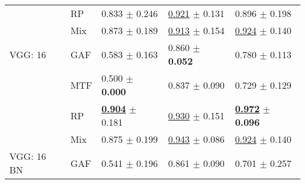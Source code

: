 \begin{tabular}[t]{lllll}
 & RP & \textcolor[rgb]{0.1665182547,0.5000000000,0}{0.833} $\pm$ \textcolor[rgb]{0.9410679338,0.0589320662,0}{0.246} & \underline{\textcolor[rgb]{0.1991869919,0.5000000000,0}{0.921}} $\pm$ \textcolor[rgb]{0.4957921792,0.5000000000,0}{0.131} & \textcolor[rgb]{0.2820512821,0.5000000000,0}{0.896} $\pm$ \textcolor[rgb]{0.6330964479,0.3669035521,0}{0.198} \\
 & Mix & \textcolor[rgb]{0.0739091719,0.5000000000,0}{0.873} $\pm$ \textcolor[rgb]{0.7220818610,0.2779181390,0}{0.189} & \underline{\textcolor[rgb]{0.2378048780,0.5000000000,0}{0.913}} $\pm$ \textcolor[rgb]{0.6415115340,0.3584884660,0}{0.154} & \underline{\textcolor[rgb]{0.1794871795,0.5000000000,0}{0.924}} $\pm$ \textcolor[rgb]{0.2698456329,0.5000000000,0}{0.140} \\
VGG: 16 & GAF & \textcolor[rgb]{0.7542297418,0.2457702582,0}{0.583} $\pm$ \textcolor[rgb]{0.6224579299,0.3775420701,0}{0.163} & \textcolor[rgb]{0.5110864745,0.4889135255,0}{0.860} $\pm$ \textbf{\textcolor[rgb]{0.0000000000,0.5000000000,0}{0.052}} & \textcolor[rgb]{0.7086247086,0.2913752914,0}{0.780} $\pm$ \textcolor[rgb]{0.1071119150,0.5000000000,0}{0.113} \\
 & MTF & \textcolor[rgb]{0.9501335708,0.0498664292,0}{0.500} $\pm$ \textbf{\textcolor[rgb]{0.0000000000,0.5000000000,0}{0.000}} & \textcolor[rgb]{0.6260162602,0.3739837398,0}{0.837} $\pm$ \textcolor[rgb]{0.2377009274,0.5000000000,0}{0.090} & \textcolor[rgb]{0.8974358974,0.1025641026,0}{0.729} $\pm$ \textcolor[rgb]{0.2017357855,0.5000000000,0}{0.129} \\
 & RP & \underline{\textbf{\textcolor[rgb]{0.0000000000,0.5000000000,0}{0.904}}} $\pm$ \textcolor[rgb]{0.6937384685,0.3062615315,0}{0.181} & \underline{\textcolor[rgb]{0.1524390244,0.5000000000,0}{0.930}} $\pm$ \textcolor[rgb]{0.6254081161,0.3745918839,0}{0.151} & \underline{\textbf{\textcolor[rgb]{0.0000000000,0.5000000000,0}{0.972}}} $\pm$ \textbf{\textcolor[rgb]{0.0000000000,0.5000000000,0}{0.096}} \\
 & Mix & \textcolor[rgb]{0.0685663402,0.5000000000,0}{0.875} $\pm$ \textcolor[rgb]{0.7623521573,0.2376478427,0}{0.199} & \underline{\textcolor[rgb]{0.0853658537,0.5000000000,0}{0.943}} $\pm$ \textcolor[rgb]{0.2161475738,0.5000000000,0}{0.086} & \underline{\textcolor[rgb]{0.1794871795,0.5000000000,0}{0.924}} $\pm$ \textcolor[rgb]{0.2698456329,0.5000000000,0}{0.140} \\
VGG: 16 BN & GAF & \textcolor[rgb]{0.8539626002,0.1460373998,0}{0.541} $\pm$ \textcolor[rgb]{0.7491692816,0.2508307184,0}{0.196} & \textcolor[rgb]{0.5066518847,0.4933481153,0}{0.861} $\pm$ \textcolor[rgb]{0.2377250888,0.5000000000,0}{0.090} & \textcolor[rgb]{1.0000000000,0.0000000000,0}{0.701} $\pm$ \textcolor[rgb]{1.0000000000,0.0000000000,0}{0.257} \\

\end{tabular}
